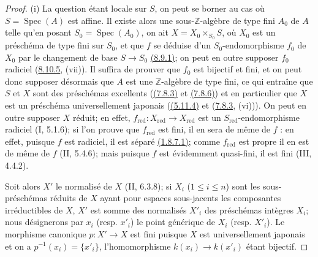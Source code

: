 \begin{proof}
\textup{(i)} La question étant locale sur $S$, on peut se borner au cas
où $S=\operatorname{Spec}(A)$ est affine. Il existe alors une
sous-$\mathbb Z$-algèbre de type fini $A_0$ de $A$ telle qu'en posant
$S_0=\operatorname{Spec}(A_0)$, on ait
$X=X_0\times_{S_0}S$, où $X_0$ est un préschéma de type fini sur $S_0$,
et que $f$ se déduise d'un $S_0$-endomorphisme $f_0$ de $X_0$ par le
changement de base $S\to S_0$
{\hyperref[canon-index.ega4.c04.prop.8-9-1]{(8.9.1)}}; on peut en outre supposer
$f_0$ radiciel ({\hyperref[canon-index.ega4.c04.thm.8-10-5]{8.10.5}}, (vii)). Il
suffira de prouver que $f_0$ est bijectif et fini, et on peut donc
supposer désormais que $A$ est une $\mathbb Z$-algèbre de type fini, ce
qui entraîne que $S$ et $X$ sont des préschémas excellents
({\hyperref[canon-index.ega4.c04.statement.7-8-3]{(7.8.3)}} et
{\hyperref[canon-index.ega4.c04.prop.7-8-6]{(7.8.6)}}) et en particulier que $X$
est un préschéma universellement japonais
({\hyperref[canon-index.ega4.c04.cor.5-11-4]{(5.11.4)}} et
({\hyperref[canon-index.ega4.c04.statement.7-8-3]{7.8.3}}, (vi))). On peut en outre
supposer $X$ réduit; en effet,
$f_{\mathrm{red}}:X_{\mathrm{red}}\to X_{\mathrm{red}}$ est un
$S_{\mathrm{red}}$-endomorphisme radiciel (I, 5.1.6); si l'on prouve que
$f_{\mathrm{red}}$ est fini, il en sera de même de $f$ : en effet,
puisque $f$ est radiciel, il est séparé
{\hyperref[canon-index.ega4.c04.lem.1-8-7-1]{(1.8.7.1)}}; comme
$f_{\mathrm{red}}$ est propre il en est de même de $f$ (II, 5.4.6);
mais puisque $f$ est évidemment quasi-fini, il est fini (III, 4.4.2).

Soit alors $X'$ le normalisé de $X$ (II, 6.3.8); si $X_i$
($1\leq i\leq n$) sont les sous-préschémas réduits de $X$ ayant pour
espaces sous-jacents les composantes irréductibles de $X$, $X'$ est
somme des normalisés $X'_i$ des préschémas intègres $X_i$; nous
désignerons par $x_i$ (resp. $x'_i$) le point générique de $X_i$
(resp. $X'_i$). Le morphisme canonique $p:X'\to X$ est fini puisque
$X$ est universellement japonais et on a
$p^{-1}(x_i)=\{x'_i\}$, l'homomorphisme $k(x_i)\to k(x'_i)$ étant
bijectif.


\end{proof}
